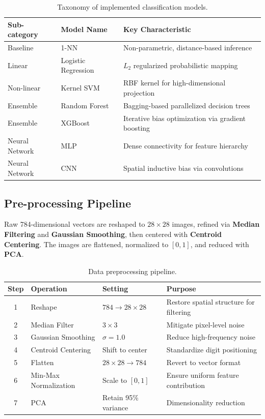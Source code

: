 \documentclass[11pt,a4paper]{article}
\begin{document}
\begin{table}[H]
    \centering
    \renewcommand{\arraystretch}{1.2} %
    \small
    \begin{tabular}{lll}
        \toprule
        \textbf{Sub-category} & \textbf{Model Name} & \textbf{Key Characteristic} \\
        \midrule
        Baseline & 1-NN & Non-parametric, distance-based inference \\
        Linear & Logistic Regression & $L_2$ regularized probabilistic mapping \\
        Non-linear & Kernel SVM & RBF kernel for high-dimensional projection \\
        Ensemble & Random Forest & Bagging-based parallelized decision trees \\
        Ensemble & XGBoost & Iterative bias optimization via gradient boosting \\
        Neural Network & MLP & Dense connectivity for feature hierarchy \\
        Neural Network & CNN & Spatial inductive bias via convolutions \\
        \bottomrule
    \end{tabular}
    \caption{Taxonomy of implemented classification models.}
\end{table}

\subsection{Pre-processing Pipeline}
Raw 784-dimensional vectors are reshaped to $28 \times 28$ images, refined via \textbf{Median Filtering} and \textbf{Gaussian Smoothing}, then centered with \textbf{Centroid Centering}. The images are flattened, normalized to $[0, 1]$, and reduced with \textbf{PCA}.

\begin{table}[H]
    \centering
    \small
    \renewcommand{\arraystretch}{1.2} %
    \begin{tabular}{clll}
        \toprule
        \textbf{Step} & \textbf{Operation} & \textbf{Setting} & \textbf{Purpose} \\
        \midrule
        1 & Reshape & $784 \to 28 \times 28$ & Restore spatial structure for filtering \\
        2 & Median Filter & $3 \times 3$ & Mitigate pixel-level noise \\
        3 & Gaussian Smoothing & $\sigma = 1.0$ & Reduce high-frequency noise \\
        4 & Centroid Centering & Shift to center & Standardize digit positioning \\
        5 & Flatten & $28 \times 28 \to 784$ & Revert to vector format \\
        6 & Min-Max Normalization & Scale to $[0, 1]$ & Ensure uniform feature contribution \\
        7 & PCA & Retain 95\% variance & Dimensionality reduction \\
        \bottomrule
    \end{tabular}
    \caption{Data preprocessing pipeline.}
\end{table}
\end{document}
